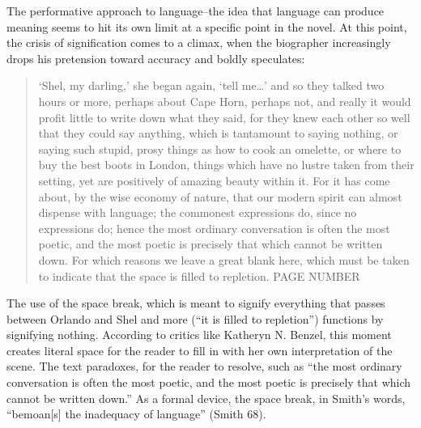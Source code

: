 \documentclass[11pt]{article}
\begin{document}
The performative approach to language--the idea that language can
produce meaning seems to hit its own limit at a specific point in the
novel. At this point, the crisis of signification comes to a climax,
when the biographer increasingly drops his pretension toward accuracy
and boldly speculates:
\begin{quote}
‘Shel, my darling,’ she began again, ‘tell me…’ and so they talked two
hours or more, perhaps about Cape Horn, perhaps not, and really it
would profit little to write down what they said, for they knew each
other so well that they could say anything, which is tantamount to
saying nothing, or saying such stupid, prosy things as how to cook an
omelette, or where to buy the best boots in London, things which have
no lustre taken from their setting, yet are positively of amazing
beauty within it. For it has come about, by the wise economy of
nature, that our modern spirit can almost dispense with language; the
commonest expressions do, since no expressions do; hence the most
ordinary conversation is often the most poetic, and the most poetic is
precisely that which cannot be written down. For which reasons we
leave a great blank here, which must be taken to indicate that the
space is filled to repletion. PAGE NUMBER
\end{quote}
The use of the space break, which is meant to signify everything that
passes between Orlando and Shel and more (“it is filled to repletion”)
functions by signifying nothing. According to critics like Katheryn
N. Benzel, this moment creates literal space for the reader to fill in
with her own interpretation of the scene. The text paradoxes, for the
reader to resolve, such as “the most ordinary conversation is often
the most poetic, and the most poetic is precisely that which cannot be
written down.” As a formal device, the space break, in Smith’s words,
“bemoan[s] the inadequacy of language” (Smith 68).
\end{document}
